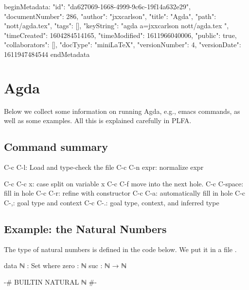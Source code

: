 beginMetadata:
{
    "id": "da627069-1668-4999-9c6c-19f14a632e29",
    "documentNumber": 286,
    "author": "jxxcarlson",
    "title": "Agda",
    "path": "nott/agda.tex",
    "tags": [],
    "keyString": "agda a=jxxcarlson nott/agda.tex ",
    "timeCreated": 1604284514165,
    "timeModified": 1611966040006,
    "public": true,
    "collaborators": [],
    "docType": "miniLaTeX",
    "versionNumber": 4,
    "versionDate": 1611947484544
}
endMetadata



\setcounter{section}{3}

\section{Agda}

\innertableofcontents



Below we collect some information on running Agda, e.g., emacs commands, as well as some examples.  All this is explained carefully in PLFA.

\subsection{Command summary}

\begin{colored}[bash]
C-c C-l: Load and type-check the file
C-c C-n expr: normalize expr

C-c C-c x: case split on variable x
C-c C-f move into the next hole.
C-c C-space: fill in hole
C-c C-r: refine with constructor
C-c C-a: automatically fill in hole
C-c C-,: goal type and context
C-c C-.: goal type, context, and inferred type
\end{colored}


\subsection{Example: the Natural Numbers}

The type of natural numbers is defined in the code below.  We put it in a file .

\begin{colored}[elm]
data ℕ : Set where
    zero : ℕ
    suc  : ℕ → ℕ
  
{-# BUILTIN NATURAL ℕ #-}
\end{colored}

